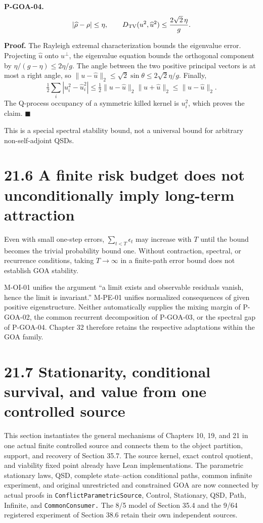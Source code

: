 \documentclass[
  english,
  11pt,
  oneside]{book}
\begin{document}
\hypertarget{p-goa-04}{}\label{p-goa-04}

\textbf{P-GOA-04.} \[|\widehat\rho-\rho|\le\eta,\qquad
D_{\rm TV}(u^2,\widehat u^2)\le\frac{2\sqrt2\,\eta}{g}.\]

\textbf{Proof.} The Rayleigh extremal characterization bounds the eigenvalue error. Projecting \(\widehat u\) onto \(u^\perp\), the eigenvalue equation bounds the orthogonal component by \(\eta/(g-\eta)\le2\eta/g\). The angle between the two positive principal vectors is at most a right angle, so \(\|u-\widehat u\|_2\le\sqrt2\sin\theta\le2\sqrt2\eta/g\). Finally, \[\tfrac12\sum_i|u_i^2-\widehat u_i^2|
\le\tfrac12\|u-\widehat u\|_2\|u+\widehat u\|_2
\le\|u-\widehat u\|_2.\] The Q-process occupancy of a symmetric killed kernel is \(u_i^2\), which proves the claim. \(\blacksquare\)

This is a special spectral stability bound, not a universal bound for arbitrary non-self-adjoint QSDs.

\section{21.6 A finite risk budget does not unconditionally imply long-term attraction}\label{a-finite-risk-budget-does-not-unconditionally-imply-long-term-attraction}

Even with small one-step errors, \(\sum_{t<T}\epsilon_t\) may increase with \(T\) until the bound becomes the trivial probability bound one. Without contraction, spectral, or recurrence conditions, taking \(T\to\infty\) in a finite-path error bound does not establish GOA stability.

M-OI-01 unifies the argument ``a limit exists and observable residuals vanish, hence the limit is invariant.'' M-PE-01 unifies normalized consequences of given positive eigenstructure. Neither automatically supplies the mixing margin of P-GOA-02, the common recurrent decomposition of P-GOA-03, or the spectral gap of P-GOA-04. Chapter 32 therefore retains the respective adaptations within the GOA family.

\section{21.7 Stationarity, conditional survival, and value from one controlled source}\label{stationarity-conditional-survival-and-value-from-one-controlled-source}

This section instantiates the general mechanisms of Chapters 10, 19, and 21 in one actual finite controlled source and connects them to the object partition, support, and recovery of Section 35.7. The source kernel, exact control quotient, and viability fixed point already have Lean implementations. The parametric stationary laws, QSD, complete state--action conditional paths, common infinite experiment, and original unrestricted and constrained GOA are now connected by actual proofs in \nolinkurl{ConflictParametricSource}, Control, Stationary, QSD, Path, Infinite, and \nolinkurl{CommonConsumer.} The 8/5 model of Section 35.4 and the 9/64 registered experiment of Section 38.6 retain their own independent sources.
\end{document}
